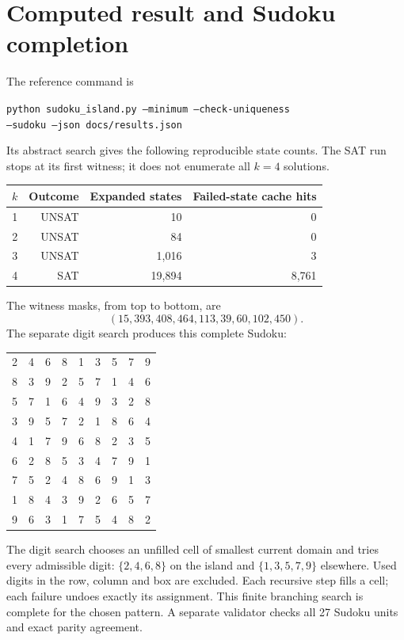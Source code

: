 \documentclass[11pt,a4paper]{article}
\begin{document}
\section{Computed result and Sudoku completion}
The reference command is
\begin{center}
\texttt{python sudoku\_island.py --minimum --check-uniqueness}\\
\texttt{--sudoku --json docs/results.json}
\end{center}
Its abstract search gives the following reproducible state counts. The SAT
run stops at its first witness; it does not enumerate all $k=4$ solutions.
\begin{center}
\begin{tabular}{rrrr}
\toprule
$k$ & Outcome & Expanded states & Failed-state cache hits\\
\midrule
1 & UNSAT & 10 & 0\\
2 & UNSAT & 84 & 0\\
3 & UNSAT & 1,016 & 3\\
4 & SAT & 19,894 & 8,761\\
\bottomrule
\end{tabular}
\end{center}
The witness masks, from top to bottom, are
\[
(15,393,408,464,113,39,60,102,450).
\]
The separate digit search produces this complete Sudoku:
\begin{center}
\renewcommand{\arraystretch}{1.15}
\begin{tabular}{|ccc|ccc|ccc|}\hline
2&4&6&8&1&3&5&7&9\\
8&3&9&2&5&7&1&4&6\\
5&7&1&6&4&9&3&2&8\\\hline
3&9&5&7&2&1&8&6&4\\
4&1&7&9&6&8&2&3&5\\
6&2&8&5&3&4&7&9&1\\\hline
7&5&2&4&8&6&9&1&3\\
1&8&4&3&9&2&6&5&7\\
9&6&3&1&7&5&4&8&2\\\hline
\end{tabular}
\end{center}
The digit search chooses an unfilled cell of smallest current domain and
tries every admissible digit: $\{2,4,6,8\}$ on the island and
$\{1,3,5,7,9\}$ elsewhere. Used digits in the row, column and box are
excluded. Each recursive step fills a cell; each failure undoes exactly its
assignment. This finite branching search is complete for the chosen pattern.
A separate validator checks all 27 Sudoku units and exact parity agreement.
\end{document}
